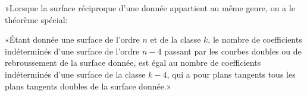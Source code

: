 \documentclass{article}
\begin{document}
»Lorsque la surface réciproque d'une donnée appartient au même genre, on a le théorème spécial:

«Étant donnée une surface de l'ordre $n$ et de la classe $k$, le nombre de coefficients indéterminés d'une surface de l'ordre $n - 4$ passant par les courbes doubles ou de rebroussement de la surface donnée, est égal au nombre de coefficients indéterminés d'une surface de la classe $k - 4$, qui a pour plans tangents tous les plans tangents doubles de la surface donnée.»
\end{document}
